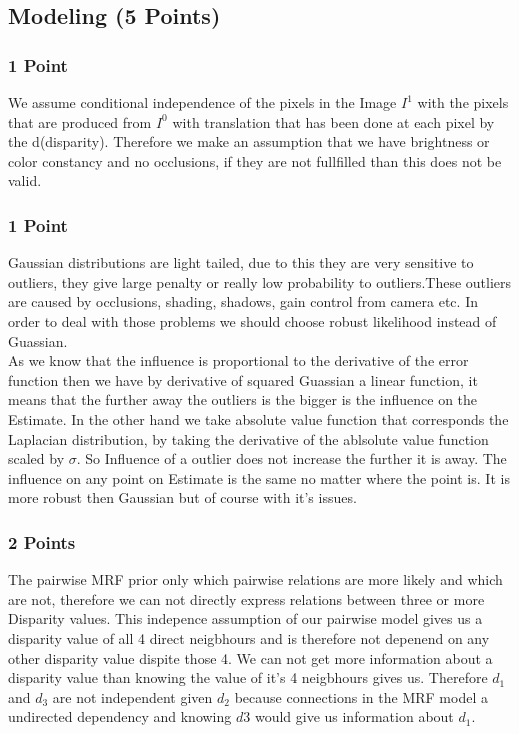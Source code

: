 \newif\ifvimbug
\vimbugfalse

\ifvimbug

\fi


\subsection{Modeling (5 Points)}
\subsubsection{1 Point}
We assume conditional independence of the pixels in the Image $I^1$ with the pixels that are produced from  $I^0$ with translation that has been done at each pixel by the d(disparity). Therefore we  make an assumption that we have brightness or color constancy and no occlusions, if they are not fullfilled than this does not be valid.
\subsubsection{1 Point}
Gaussian distributions are light tailed, due to this they are very sensitive to outliers, they give large penalty or really low probability to outliers.These outliers are caused by occlusions, shading, shadows, gain control from camera etc. In order to deal with those problems we should choose robust likelihood instead of Guassian.\\
As we know that the influence is proportional to the derivative of the error function then we have by derivative of squared Guassian a linear function, it means that the further away the outliers is the bigger is the influence on the Estimate. In the other hand we take absolute value function that corresponds the Laplacian distribution, by taking the derivative of  the ablsolute value function scaled by $\sigma$. So Influence of a outlier does not increase the further it is away. The influence on any point on Estimate is the same no matter where the point is. It is more robust then Gaussian but of course with it's issues.
\subsubsection{2 Points}
The pairwise MRF prior only which pairwise relations are more likely and which are not, therefore we can not directly express relations between three or more Disparity values. This indepence assumption of our pairwise model gives us a disparity value of all 4 direct neigbhours and is therefore not depenend on any other disparity value dispite those 4. We can not get more information about a disparity value than knowing the value of it's 4 neigbhours gives us. Therefore $d_1$ and $d_3$ are not independent given $d_2$ because connections in the MRF model a undirected dependency and knowing $d3$ would give us information about $d_1$.
